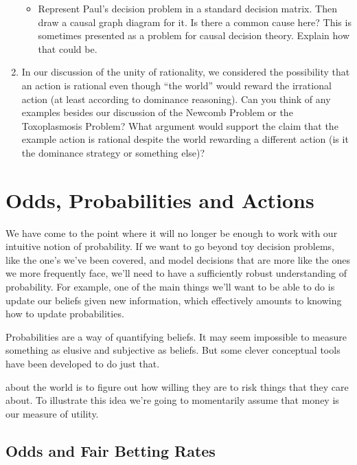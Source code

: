 \documentclass[]{tufte-book}
\providecommand{\tightlist}{%
  \setlength{\itemsep}{0pt}\setlength{\parskip}{0pt}}
\begin{document}
\begin{enumerate}
  \begin{itemize}
  \tightlist
  \item
    Represent Paul's decision problem in a standard decision matrix. Then draw a causal graph diagram for it. Is there a common cause here? This is sometimes presented as a problem for causal decision theory. Explain how that could be.
  \end{itemize}
\item
  In our discussion of the unity of rationality, we considered the possibility that an action is rational even though ``the world'' would reward the irrational action (at least according to dominance reasoning). Can you think of any examples besides our discussion of the Newcomb Problem or the Toxoplasmosis Problem? What argument would support the claim that the example action is rational despite the world rewarding a different action (is it the dominance strategy or something else)?
\end{enumerate}

\hypertarget{odds-probabilities-and-actions}{%
\chapter{Odds, Probabilities and Actions}\label{odds-probabilities-and-actions}}

We have come to the point where it will no longer be enough to work with our intuitive notion of probability. If we want to go beyond toy decision problems, like the one's we've been covered, and model decisions that are more like the ones we more frequently face, we'll need to have a sufficiently robust understanding of probability. For example, one of the main things we'll want to be able to do is update our beliefs given new information, which effectively amounts to knowing how to update probabilities.

Probabilities are a way of quantifying beliefs. It may seem impossible to measure something as elusive and subjective as beliefs. But some clever conceptual tools have been developed to do just that.

 about the world is to figure out how willing they are to risk things that they care about. To illustrate this idea we're going to momentarily assume that money is our measure of utility.

\hypertarget{odds-and-fair-betting-rates}{%
\section{Odds and Fair Betting Rates}\label{odds-and-fair-betting-rates}}
\end{document}
